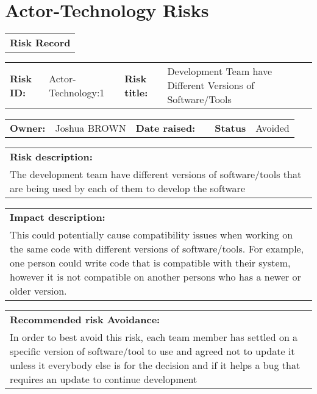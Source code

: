 \FloatBarrier

\section{Actor-Technology Risks}
\label{Actor-Technology_Risks}

\FloatBarrier

\begin{table}
	\begin{tabularx}{\textwidth}{| X |}
		\hline
		\textbf{Risk Record} \\
	\end{tabularx}
	\begin{tabularx}{\textwidth}{| l | X | l | X |}
		\hline
		\textbf{Risk ID:} & Actor-Technology:1 & \textbf{Risk title:} & Development Team have Different Versions of Software/Tools  \\
	\end{tabularx}
	\begin{tabularx}{\textwidth}{| l | X | l | X | l | X |}
		\hline
		\textbf{Owner:} & Joshua BROWN & \textbf{Date raised:} &  & \textbf{Status} & Avoided \\
	\end{tabularx}
	\begin{tabularx}{\textwidth}{| X |}
		\hline
		\textbf{Risk description:} \\ The development team have different versions of software/tools that are being used by each of them to develop the software \\
	\end{tabularx}
	\begin{tabularx}{\textwidth}{| X |}
		\hline
		\textbf{Impact description:} \\ This could potentially cause compatibility issues when working on the same code with different versions of software/tools. For example, one person could write code that is compatible with their system, however it is not compatible on another persons who has a newer or older version. \\
	\end{tabularx}
	\begin{tabularx}{\textwidth}{| X |}
		\hline
		\textbf{Recommended risk Avoidance:} \\ In order to best avoid this risk, each team member has settled on a specific version of software/tool to use and agreed not to update it unless it everybody else is for the decision and if it helps a bug that requires an update to continue development \\

\end{tabularx}
\end{table}
